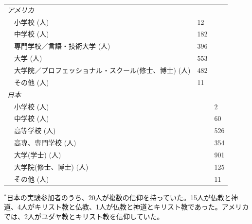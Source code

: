 \documentclass[a4j,12pt]{jreport}
\begin{document}
\begin{table}[h]
{\begin{threeparttable}
\begin{tabular}{@{}lll@{}}
\textsl{アメリカ}                                                                   &               &                  \\
~~小学校 (人)                                       & 12          &                  \\
~~中学校    (人)                                      & 182          &                  \\
~~専門学校／言語・技術大学   (人)         & 396        &                  \\
~~大学          (人)                     & 553      &                  \\
~~大学院／プロフェッショナル・スクール(修士、博士)  (人)    & 482        &                  \\
~~その他   (人)                                       & 11        &                  \\
\textsl{日本}                                                             &               &                  \\
~~小学校   (人)                              &               & 2             \\
~~中学校   (人)                            &               & 60             \\
~~高等学校    (人)                                  &               & 526             \\
~~高専、専門学校   (人)                                            &               & 354             \\
~~大学(学士)   (人)                                 &               & 901         \\
~~大学院(修士、博士)   (人)                                       &               & 125              \\ 
~~その他     (人)                                     &               & 11            \\ \bottomrule
\end{tabular}
    \begin{tablenotes}
      \small
      \item $^{*}$日本の実験参加者のうち、20人が複数の信仰を持っていた。15人が仏教と神道、4人がキリスト教と仏教、1人が仏教と神道とキリスト教であった。アメリカでは、2人がユダヤ教とキリスト教を信仰していた。
 \end{tablenotes}
  \end{threeparttable}
  }
\end{table}
\end{document}

